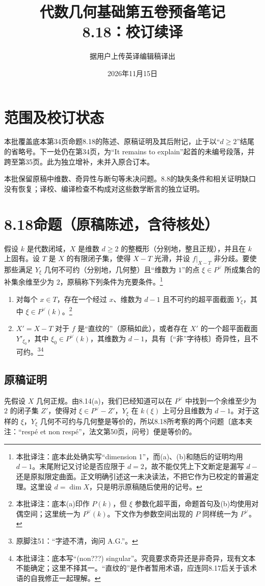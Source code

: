 \documentclass[openany]{ctexbook}
\title{代数几何基础第五卷预备笔记\\8.18：校订续译}
\author{据用户上传英译编辑稿译出}
\date{2026年11月15日}
\newcommand{\note}[1]{\footnote{本批译注：#1}}
\begin{document}
\maketitle
\chapter*{范围及校订状态}
本批覆盖底本第34页命题8.18的陈述、原稿证明及其后附记，止于以“$d\ge2$”结尾的省略号。下一处仍在第34页，为“It remains to explain”起首的未编号段落，并跨至第35页。此为独立增补，未并入原合订本。

本批保留原稿中维数、奇异性与断句等未决问题。8.8的缺失条件和相关证明缺口没有恢复；译校、编译检查不构成对这些数学断言的独立证明。
\chapter*{8.18\quad 命题（原稿陈述，含待核处）}
假设 $k$ 是代数闭域，$X$ 是维数 $d\ge2$ 的整概形（分别地，整且正规），并且在 $k$ 上固有。设 $T$ 是 $X$ 的有限闭子集，使得 $X-T$ 光滑，并设 $f|_{X-T}$ 非分歧。要使那些满足 $Y_\xi$ 几何不可约（分别地，几何整）且“维数为 $1$”的点 $\xi\in P^\vee$ 所成集合的补集余维至少为 $2$，原稿称下列条件为充要条件。\note{底本此处确实写“dimension 1”，而(a)、(b)和随后的证明均用 $d-1$。末尾附记又讨论是否应限于 $d=2$，故不能仅凭上下文断定是漏写 $d-$ 还是原拟限定曲面。正文明确引述这一未决读法，不把它作为已校定的普遍定理。这里设 $d=\dim X$，只是明示原稿随后使用的记号。}
\begin{enumerate}
\item[(a)] 对每个 $x\in T$，存在一个经过 $x$、维数为 $d-1$ 且不可约的超平面截面 $Y_\xi$，其中 $\xi\in P^\vee(k)$。\note{底本(a)印作 $P(k)$，但 $\xi$ 参数化超平面，命题首句及(b)均使用对偶空间；这里统一为 $P^\vee(k)$。下文作为参数空间出现的 $P$ 同样统一为 $P^\vee$。}
\item[(b)] $X'=X-T$ 对于 $f$ 是“直纹的”（原稿如此），或者存在 $X'$ 的一个超平面截面 $Y'_{\xi_0}$，其中 $\xi_0\in P^\vee(k)$，其维数为 $d-1$，具有〔“非”字待核〕奇异性，且不可约。\footnote{原脚注51：“字迹不清，询问 A.G.”。}\note{底本写“(non???) singular”。究竟要求奇异还是非奇异，现有文本不能确定；这里不择其一。“直纹的”是作者暂用术语，应连同8.17后关于该术语的自我修正一起理解。}
\end{enumerate}
\section*{原稿证明}
先假设 $X$ 几何正规。由8.14(a)，我们已经知道可以在 $P^\vee$ 中找到一个余维至少为 $2$ 的闭子集 $Z'$，使得对 $\xi\in P^\vee-Z'$，$Y_\xi$ 在 $k(\xi)$ 上可分且维数为 $d-1$。对于这样的 $\xi$，$Y_\xi$ 几何不可约与几何整是等价的，所以8.18所考察的两个问题〔底本夹注：“respé et non respé”，法文第50页，问号〕便是等价的。
\end{document}
